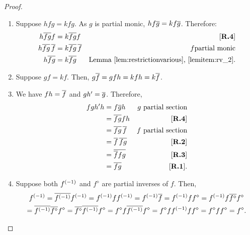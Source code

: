 \begin{proof}
  \prepprooflist
  \begin{enumerate}[{(}i{)}]
    \item Suppose $h f g = k f g$. As $g$ is partial monic, $h f \overline{g} = k f \overline{g}$.
      Therefore:
      \begin{align*}
        h \overline{f g} f &= k \overline{f g} f &[\text{\bfseries {R}.{4}}]\\
        h \overline{f g}\,\overline{f} &= k \overline{f g}\, \overline{f} & f\text{partial monic}\\
        h \overline{f g}&= k \overline{f g} & \text{Lemma \ref{lem:restrictionvarious},
          \ref{lemitem:rv_2}.}
      \end{align*}
    \item Suppose $g f = k f$. Then, $g\overline{f} = g f h = k f h = k \overline{f}$.
    \item We have $f h = \overline{f}$ and $g h' = \overline{g}$. Therefore,
      \begin{align*}
        f g h' h &= f \overline{g} h & g \text{ partial section}\\
        &= \overline{f g} f h & [\text{\bfseries {R}.{4}}]\\
        &= \overline{f g}\, \overline{f} & f \text{ partial section}\\
        &= \overline{f}\, \overline{f g} & [\text{\bfseries {R}.{2}}]\\
        &= \overline{\overline{f}f g} & [\text{\bfseries {R}.{3}}]\\
        &= \overline{f g} & [\text{\bfseries {R}.{1}}].
      \end{align*}
    \item Suppose both ${f}^{(-1)}$ and $f^{\diamond}$ are partial inverses of $f$. Then,
      \begin{multline*}
        \inv{f}
        = \restr{\inv{f}}\inv{f} %
        =\inv{f}f\inv{f}  %
        = \inv{f} \restr{f}   %
        = \inv{f} f f^{\diamond}   %
        = \inv{f} f \restr{f^{\diamond}} f^{\diamond}  \\ %
        = \restr{\inv{f}}\restr{f^{\diamond}} f^{\diamond}   %
        = \restr{f^{\diamond}}\restr{\inv{f}} f^{\diamond} %
        = f^{\diamond} f \restr{\inv{f}}  f^{\diamond} %
        = f^{\diamond} f \inv{f} f f^{\diamond} %
        = f^{\diamond} f f^{\diamond} %
        = f^{\diamond}. %
      \end{multline*}

\end{enumerate}
\end{proof}
